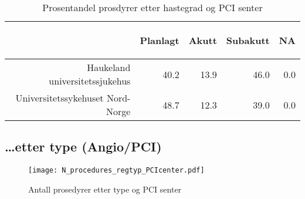 \documentclass[norsk, a4paper]{report}
\begin{document}
\begin{tiny}
\begin{table}[ht]
\centering
\begin{tabular}{rrrrr}
  \toprule
 & \begin{sideways} Planlagt \end{sideways} & \begin{sideways} Akutt \end{sideways} & \begin{sideways} Subakutt \end{sideways} & \begin{sideways} NA \end{sideways} \\ 
  \midrule
Haukeland universitetssjukehus & 40.2 & 13.9 & 46.0 & 0.0 \\ 
  Universitetssykehuset Nord-Norge & 48.7 & 12.3 & 39.0 & 0.0 \\ 
   \bottomrule
\end{tabular}
\caption{Prosentandel prosdyrer etter hastegrad og PCI senter} 
\end{table}\end{tiny}



\clearpage
\subsection{\ldots etter type (Angio/PCI)}


\begin{figure}[ht]
  \centering
\texttt{[image: N\_procedures\_regtyp\_PCIcenter.pdf]}  \caption{Antall prosedyrer etter type og PCI senter}
\end{figure}
\end{document}
